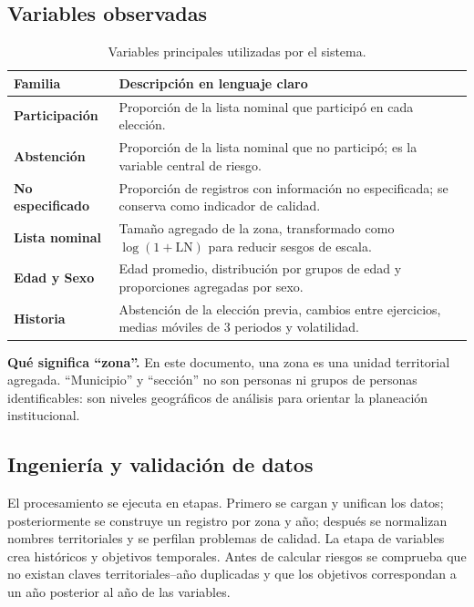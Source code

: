\documentclass[11pt,a4paper]{article}
\begin{document}
\subsection{Variables observadas}

\begin{table}[H]
\centering
\caption{Variables principales utilizadas por el sistema.}\label{tab:variables}
\begin{tabularx}{\textwidth}{>{\bfseries}p{}X}
\toprule
\textbf{Familia} & \textbf{Descripción en lenguaje claro}\\
\midrule
Participación & Proporción de la lista nominal que participó en cada elección.\\
Abstención & Proporción de la lista nominal que no participó; es la variable central de riesgo.\\
No especificado & Proporción de registros con información no especificada; se conserva como indicador de calidad.\\
Lista nominal & Tamaño agregado de la zona, transformado como $\log(1+\text{LN})$ para reducir sesgos de escala.\\
Edad y Sexo & Edad promedio, distribución por grupos de edad y proporciones agregadas por sexo.\\
Historia & Abstención de la elección previa, cambios entre ejercicios, medias móviles de 3 periodos y volatilidad.\\
\bottomrule
\end{tabularx}
\end{table}

\begin{definicion}
\textbf{Qué significa ``zona''.} En este documento, una zona es una unidad territorial agregada. ``Municipio'' y ``sección'' no son personas ni grupos de personas identificables: son niveles geográficos de análisis para orientar la planeación institucional.
\end{definicion}

\subsection{Ingeniería y validación de datos}

El procesamiento se ejecuta en etapas. Primero se cargan y unifican los datos; posteriormente se construye un registro por zona y año; después se normalizan nombres territoriales y se perfilan problemas de calidad. La etapa de variables crea históricos y objetivos temporales. Antes de calcular riesgos se comprueba que no existan claves territoriales--año duplicadas y que los objetivos correspondan a un año posterior al año de las variables.
\end{document}
